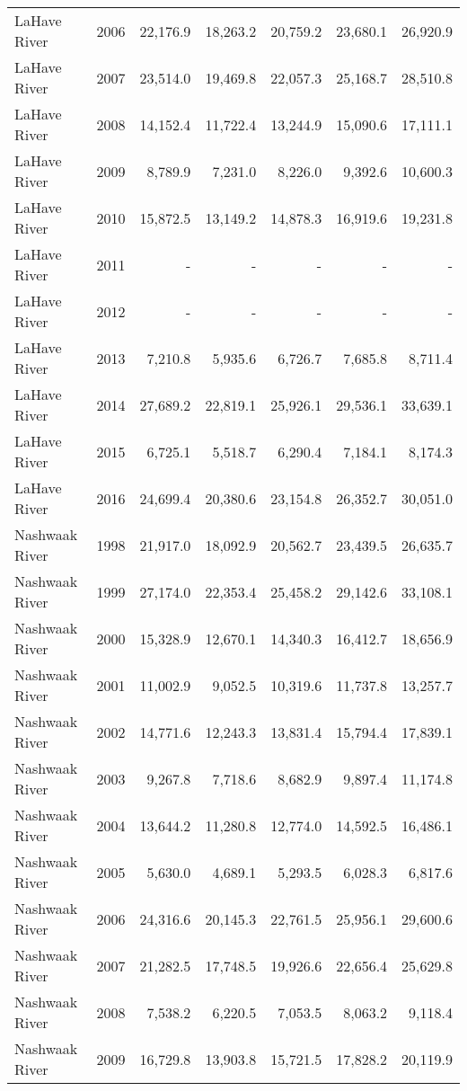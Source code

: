 \begin{longtable}{llrrrrr}
  LaHave River & 2006 & 22,176.9 & 18,263.2 & 20,759.2 & 23,680.1 & 26,920.9 \\ 
  LaHave River & 2007 & 23,514.0 & 19,469.8 & 22,057.3 & 25,168.7 & 28,510.8 \\ 
  LaHave River & 2008 & 14,152.4 & 11,722.4 & 13,244.9 & 15,090.6 & 17,111.1 \\ 
  LaHave River & 2009 & 8,789.9 & 7,231.0 & 8,226.0 & 9,392.6 & 10,600.3 \\ 
  LaHave River & 2010 & 15,872.5 & 13,149.2 & 14,878.3 & 16,919.6 & 19,231.8 \\ 
  LaHave River & 2011 & - & - & - & - & - \\ 
  LaHave River & 2012 & - & - & - & - & - \\ 
  LaHave River & 2013 & 7,210.8 & 5,935.6 & 6,726.7 & 7,685.8 & 8,711.4 \\ 
  LaHave River & 2014 & 27,689.2 & 22,819.1 & 25,926.1 & 29,536.1 & 33,639.1 \\ 
  LaHave River & 2015 & 6,725.1 & 5,518.7 & 6,290.4 & 7,184.1 & 8,174.3 \\ 
  LaHave River & 2016 & 24,699.4 & 20,380.6 & 23,154.8 & 26,352.7 & 30,051.0 \\ 
  Nashwaak River & 1998 & 21,917.0 & 18,092.9 & 20,562.7 & 23,439.5 & 26,635.7 \\ 
  Nashwaak River & 1999 & 27,174.0 & 22,353.4 & 25,458.2 & 29,142.6 & 33,108.1 \\ 
  Nashwaak River & 2000 & 15,328.9 & 12,670.1 & 14,340.3 & 16,412.7 & 18,656.9 \\ 
  Nashwaak River & 2001 & 11,002.9 & 9,052.5 & 10,319.6 & 11,737.8 & 13,257.7 \\ 
  Nashwaak River & 2002 & 14,771.6 & 12,243.3 & 13,831.4 & 15,794.4 & 17,839.1 \\ 
  Nashwaak River & 2003 & 9,267.8 & 7,718.6 & 8,682.9 & 9,897.4 & 11,174.8 \\ 
  Nashwaak River & 2004 & 13,644.2 & 11,280.8 & 12,774.0 & 14,592.5 & 16,486.1 \\ 
  Nashwaak River & 2005 & 5,630.0 & 4,689.1 & 5,293.5 & 6,028.3 & 6,817.6 \\ 
  Nashwaak River & 2006 & 24,316.6 & 20,145.3 & 22,761.5 & 25,956.1 & 29,600.6 \\ 
  Nashwaak River & 2007 & 21,282.5 & 17,748.5 & 19,926.6 & 22,656.4 & 25,629.8 \\ 
  Nashwaak River & 2008 & 7,538.2 & 6,220.5 & 7,053.5 & 8,063.2 & 9,118.4 \\ 
  Nashwaak River & 2009 & 16,729.8 & 13,903.8 & 15,721.5 & 17,828.2 & 20,119.9 \\ 

\end{longtable}
